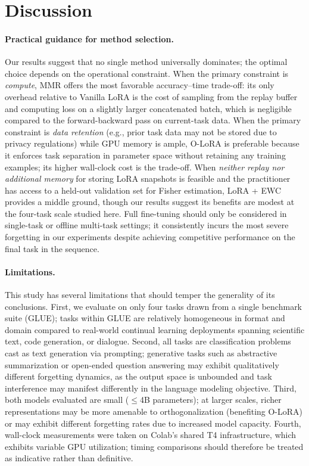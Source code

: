 \section{Discussion}
\label{sec:discussion}

\paragraph{Practical guidance for method selection.}
Our results suggest that no single method universally dominates; the optimal choice depends on the
operational constraint.
When the primary constraint is \emph{compute}, MMR offers the most favorable accuracy--time
trade-off: its only overhead relative to Vanilla LoRA is the cost of sampling from the replay
buffer and computing loss on a slightly larger concatenated batch, which is negligible compared to
the forward-backward pass on current-task data.
When the primary constraint is \emph{data retention} (e.g., prior task data may not be stored due
to privacy regulations) while GPU memory is ample, O-LoRA is preferable because it enforces task
separation in parameter space without retaining any training examples; its higher wall-clock cost
is the trade-off.
When \emph{neither replay nor additional memory} for storing LoRA snapshots is feasible and the
practitioner has access to a held-out validation set for Fisher estimation, LoRA + EWC provides a
middle ground, though our results suggest its benefits are modest at the four-task scale studied
here.
Full fine-tuning should only be considered in single-task or offline multi-task settings; it
consistently incurs the most severe forgetting in our experiments despite achieving competitive
performance on the final task in the sequence.

\paragraph{Limitations.}
This study has several limitations that should temper the generality of its conclusions.
First, we evaluate on only four tasks drawn from a single benchmark suite (GLUE); tasks within
GLUE are relatively homogeneous in format and domain compared to real-world continual learning
deployments spanning scientific text, code generation, or dialogue.
Second, all tasks are classification problems cast as text generation via prompting; generative
tasks such as abstractive summarization or open-ended question answering may exhibit qualitatively
different forgetting dynamics, as the output space is unbounded and task interference may manifest
differently in the language modeling objective.
Third, both models evaluated are small ($\leq$4B parameters); at larger scales, richer
representations may be more amenable to orthogonalization (benefiting O-LoRA) or may exhibit
different forgetting rates due to increased model capacity.
Fourth, wall-clock measurements were taken on Colab's shared T4 infrastructure, which exhibits
variable GPU utilization; timing comparisons should therefore be treated as indicative rather than
definitive.

